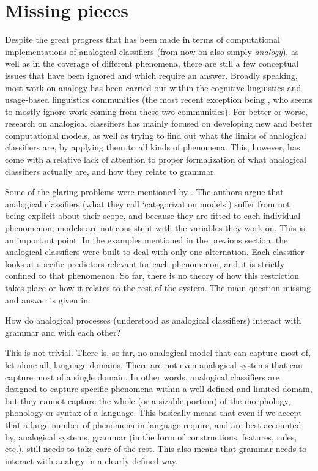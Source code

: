 \section{Missing pieces}

Despite the great progress that has been made in terms of computational implementations of analogical classifiers (from now on also simply \textit{analogy}), as well as in the coverage of different phenomena, there are still a few conceptual issues that have been ignored and which require an answer. Broadly speaking, most work on analogy has been carried out within the cognitive linguistics and usage-based linguistics communities (the most recent exception being \textcite{Gouskova.2015}, who seems to mostly ignore work coming from these two communities). For better or worse, research on analogical classifiers has mainly focused on developing new and better computational models, as well as trying to find out what the limits of analogical classifiers are, by applying them to all kinds of phenomena. This, however, has come with a relative lack of attention to proper formalization of what analogical classifiers actually are, and how they relate to grammar.

Some of the glaring problems were mentioned by \textcite{Wills.2012}. The authors argue that analogical classifiers (what they call `categorization models') suffer from not being explicit about their scope, and because they are fitted to each individual phenomenon, models are not consistent with the variables they work on. This is an important point. In the examples mentioned in the previous section, the analogical classifiers were built to deal with only one alternation. Each classifier looks at specific predictors relevant for each phenomenon, and it is strictly confined to that phenomenon. So far, there is no theory of how this restriction takes place or how it relates to the rest of the system. The main question missing and answer is given in:

\begin{exe}
    \ex \label{question} How do analogical processes (understood as analogical classifiers) interact with grammar and with each other?
\end{exe}

This is not trivial. There is, so far, no analogical model that can capture most of, let alone all, language domains. There are not even analogical systems that can capture most of a single domain. In other words, analogical classifiers are designed to capture specific phenomena within a well defined and limited domain, but they cannot capture the whole (or a sizable portion) of the morphology, phonology or syntax of a language. This basically means that even if we accept that a large number of phenomena in language require, and are best accounted by, analogical systems, grammar (in the form of constructions, features, rules, etc.), still needs to take care of the rest. This also means that grammar needs to interact with analogy in a clearly defined way.

